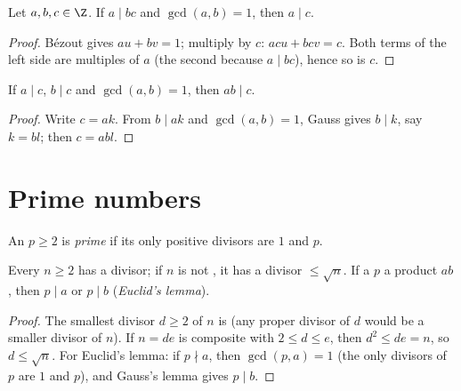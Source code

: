 \begin{theorem}\label{thm:g12:arith:gauss}
Let $a, b, c \in \Z$. If $a \mid bc$ and $\gcd(a, b) = 1$, then $a \mid c$.
\end{theorem}

\begin{proof}
Bézout gives $au + bv = 1$; multiply by $c$: $acu + bcv = c$. Both terms of
the left side are multiples of $a$ (the second because $a \mid bc$), hence
so is $c$.
\end{proof}

\begin{corollary}\label{cor:g12:arith:coprimeprod}
If $a \mid c$, $b \mid c$ and $\gcd(a,b) = 1$, then $ab \mid c$.
\end{corollary}

\begin{proof}
Write $c = ak$. From $b \mid ak$ and $\gcd(a,b)=1$, Gauss gives
$b \mid k$, say $k = bl$; then $c = abl$.
\end{proof}

\section{Prime numbers}

\begin{definition}[Prime]\label{def:g12:arith:prime}
An  $p \geq 2$ is \emph{prime} if its only
positive divisors are $1$ and $p$.
\end{definition}

\begin{proposition}\label{prop:g12:arith:primedivides}
Every  $n \geq 2$ has a  divisor; if $n$ is not , it has a
 divisor $\leq \sqrt n$. If a  $p$  a product $ab$, then
$p \mid a$ or $p \mid b$ (\emph{Euclid's lemma}).
\end{proposition}

\begin{proof}
The smallest divisor $d \geq 2$ of $n$ is  (any proper divisor of $d$
would be a smaller divisor of $n$). If $n = de$ is composite with
$2 \leq d \leq e$, then $d^2 \leq de = n$, so $d \leq \sqrt n$. For Euclid's
lemma: if $p \nmid a$, then $\gcd(p, a) = 1$ (the only divisors of $p$ are
$1$ and $p$), and Gauss's lemma gives $p \mid b$.
\end{proof}

